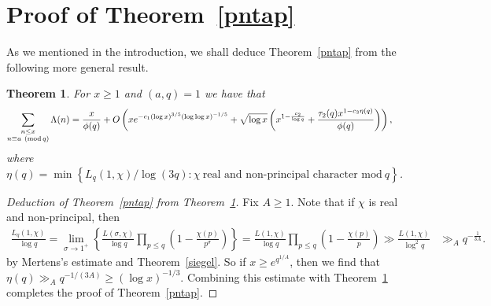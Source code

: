 \documentclass[12pt]{amsart}
\newtheorem{theorem}{Theorem}[section]
\theoremstyle{remark}
\numberwithin{equation}{section}
\renewcommand{\pmod}[1]{~({\rm mod}\,#1)}
\begin{document}

\section{Proof of Theorem~\ref{pntap}}\label{proofs}

As we mentioned in the introduction, we shall deduce Theorem~\ref{pntap} from the following more general result.

\begin{theorem}\label{pntap2} For $x\ge1$ and $(a,q)=1$ we have that
\begin{align*}
\sum_{\substack{n\le x\\n\equiv a\pmod q}}\Lambda(n)
=\frac x{\phi(q)}& + O\left(xe^{-c_1(\log x)^{3/5}(\log\log x)^{-1/5}}+ \sqrt{\log x}\left( x^{1-\frac{c_2}{\log q} } + \frac{\tau_2(q) x^{1-c_3\eta(q)} } {\phi(q)} \right) \right),
\end{align*}
where $\eta(q)=\min\left\{ L_q(1,\chi) / \log(3q) :\chi\ \text{real and non-principal character mod}\ q\right\}$.
\end{theorem}

\begin{proof}[Deduction of Theorem~\ref{pntap} from Theorem~\ref{pntap2}]
Fix $A\ge1$. Note that if $\chi$ is real and non-principal, then
\begin{align*}
\frac{L_q(1,\chi)}{\log q}  =\lim_{\sigma\to1^+} \left\{\frac{L(\sigma,\chi)}{\log q} \prod_{p\le q} \left(1-\frac{\chi(p)}{p^\sigma}\right)\right\}
 =\frac{L(1,\chi)}{\log q} \prod_{p\le q} \left( 1-\frac{\chi(p)}p \right)
\gg \frac{L(1,\chi)} {\log^2q} &\gg_A  q^{-\frac1{3A}}.
\end{align*}
by Mertens's estimate and Theorem~\ref{siegel}. So if $x\ge e^{q^{1/A}}$, then we find that $\eta(q)\gg_A q^{-1/(3A)}\ge(\log x)^{-1/3}$. Combining this estimate with Theorem~\ref{pntap2} completes the proof of Theorem~\ref{pntap}.
\end{proof}
\end{document}
